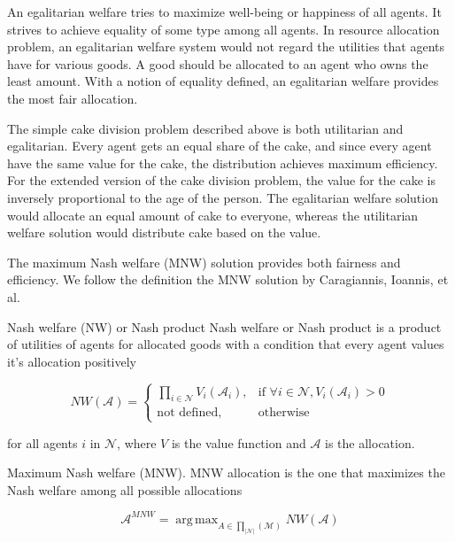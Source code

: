 An egalitarian welfare tries to maximize well-being or happiness of all agents. It strives to achieve equality of some type among all agents. In resource allocation problem, an egalitarian welfare system would not regard the utilities that agents have for various goods. A good should be allocated to an agent who owns the least amount. With a notion of equality defined, an egalitarian welfare provides the most fair allocation.

The simple cake division problem described above is both utilitarian and egalitarian. Every agent gets an equal share of the cake, and since every agent have the same value for the cake, the distribution achieves maximum efficiency. For the extended version of the cake division problem, the value for the cake is inversely proportional to the age of the person. The egalitarian welfare solution would allocate an equal amount of cake to everyone, whereas the utilitarian welfare solution would distribute cake based on the value.

The maximum Nash welfare (MNW) solution provides both fairness and efficiency. We follow the definition the MNW solution by Caragiannis, Ioannis, et al. \cite{caragiannis2016unreasonable}

\begin{definition}{Nash welfare (NW) or Nash product} \label{def_nw}
Nash welfare or Nash product is a product of utilities of agents for allocated goods with a condition that every agent values it's allocation positively

\begin{equation}
    NW(\mathcal{A}) = 
    \begin{cases}
    \prod_{i \in \mathcal{N}} V_i(\mathcal{A}_i), & \text{if } \forall i \in \mathcal{N}, V_i(\mathcal{A}_i) > 0 \\
    \text{not defined}, & \text{otherwise}
    \end{cases}
\end{equation}

for all agents $i$ in $\mathcal{N}$, where $V$ is the value function and $\mathcal{A}$ is the allocation.
\end{definition}

\begin{definition}{Maximum Nash welfare (MNW).} \label{def_mnw}
MNW allocation is the one that maximizes the Nash welfare among all possible allocations

$$
    \mathcal{A}^{MNW} = \operatorname{arg\,max}_{A \in \prod_{|\mathcal{N}|}(\mathcal{M})} NW(\mathcal{A})
$$
\end{definition}


